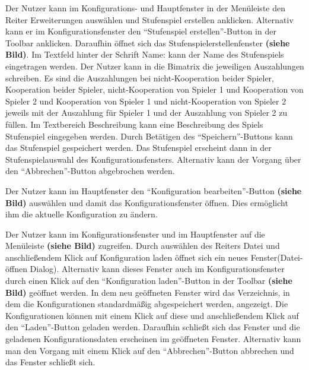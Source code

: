 \documentclass[parskip=full,11pt,twoside]{scrartcl}
\begin{document}

Der Nutzer kann im Konfigurations- und Hauptfenster in der Menüleiste den Reiter Erweiterungen auswählen und Stufenspiel erstellen anklicken. Alternativ kann er im Konfigurationsfenster den \enquote{Stufenspiel erstellen}-Button in der Toolbar anklicken. Daraufhin öffnet sich das Stufenspielerstellenfenster \textbf{(siehe Bild)}. Im Textfeld hinter der Schrift Name: kann der Name des Stufenspiels eingetragen werden. Der Nutzer kann in die Bimatrix die jeweiligen Auszahlungen schreiben. Es sind die Auszahlungen bei nicht-Kooperation beider Spieler, Kooperation beider Spieler, nicht-Kooperation von Spieler 1 und Kooperation von Spieler 2 und Kooperation von Spieler 1 und nicht-Kooperation von Spieler 2 jeweils mit der Auszahlung für Spieler 1 und der Auszahlung von Spieler 2 zu füllen. Im Textbereich Beschreibung kann eine Beschreibung des Spiels Stufenspiel eingegeben werden. Durch Betätigen des \enquote{Speichern}-Buttons kann das Stufenspiel gespeichert werden. Das Stufenspiel erscheint dann in der Stufenspielauswahl des Konfigurationsfensters. Alternativ kann der Vorgang über den \enquote{Abbrechen}-Button abgebrochen werden.


Der Nutzer kann im Hauptfenster den \enquote{Konfiguration bearbeiten}-Button \textbf{(siehe Bild)} auswählen und damit das Konfigurationsfenster öffnen. Dies ermöglicht ihm die aktuelle Konfiguration zu ändern.


Der Nutzer kann im Konfigurationsfenster und im Hauptfenster auf die Menüleiste \textbf{(siehe Bild)} zugreifen. Durch auswählen des Reiters Datei und anschließendem Klick auf Konfiguration laden öffnet sich ein neues Fenster(Datei-öffnen Dialog). Alternativ kann dieses Fenster auch im Konfigurationsfenster durch einen Klick auf den \enquote{Konfiguration laden}-Button in der Toolbar \textbf{(siehe Bild)} geöffnet werden. In dem neu geöffneten Fenster wird das Verzeichnis, in dem die Konfigurationen standardmäßig abgespeichert werden, angezeigt. Die Konfigurationen können mit einem Klick auf diese und anschließendem Klick auf den \enquote{Laden}-Button geladen werden. Daraufhin schließt sich das Fenster und die geladenen Konfigurationsdaten erscheinen im geöffneten Fenster. Alternativ kann man den Vorgang mit einem Klick auf den \enquote{Abbrechen}-Button abbrechen und das Fenster schließt sich.
\end{document}

